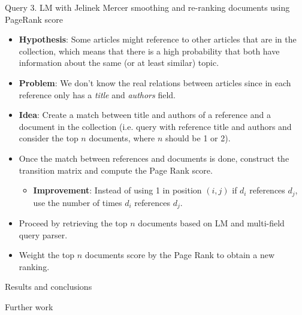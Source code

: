 \documentclass[10pt]{beamer}
\begin{document}
{\begin{frame}{Query 3. LM with Jelinek Mercer smoothing and re-ranking documents using PageRank score}
    \begin{itemize}
        \item \textbf{Hypothesis}: Some articles might reference to other articles that are in the collection, which means that there is a high probability that both have information about the same (or at least similar) topic. 
        \item \textbf{Problem}: We don't know the real relations between articles since in each reference only has a \textit{title} and \textit{authors} field.
        \item \textbf{Idea}: Create a match between title and authors of a reference and a document in the collection (i.e. query with reference title and authors and consider the top $n$ documents, where $n$ should be 1 or 2).
        \item Once the match between references and documents is done, construct the transition matrix and compute the Page Rank score.
        \begin{itemize}
            \item \textbf{Improvement}: Instead of using 1 in position $(i, j)$ if $d_i$ references $d_j$, use the number of times $d_i$ references $d_j$.
        \end{itemize}
        \item Proceed by retrieving the top $n$ documents based on LM and multi-field query parser.
        \item Weight the top $n$ documents score by the Page Rank to obtain a new ranking.
    \end{itemize}
\end{frame}


}

\begin{frame}{Results and conclusions}
    
\end{frame}

\begin{frame}{Further work}
    
\end{frame}


\begin{frame}
    
    
\end{frame}
\end{document}
